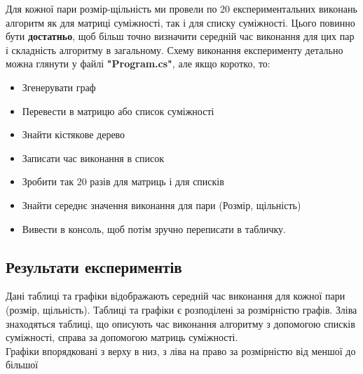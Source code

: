 \documentclass[titlepage, a4paper]{article}
\begin{document}
Для кожної пари розмір-щільність ми провели по 20 експериментальних виконань алгоритм як для матриці суміжності, так і для списку суміжності. Цього повинно бути \textbf{достатньо}, щоб більш точно визначити середній час виконання для цих пар і складність алгоритму в загальному. Схему виконання експерименту детально можна глянути у файлі \textbf{"Program.cs"}, але якщо коротко, то:
\begin{itemize}
	\item Згенерувати граф
	\item Перевести в матрицю або список суміжності
	\item Знайти кістякове дерево
	\item Записати час виконання в список
	\item Зробити так 20 разів для матриць і для списків
	\item Знайти середнє значення виконання для пари (Розмір, щільність)
	\item Вивести в консоль, щоб потім зручно переписати в табличку.
\end{itemize}

\subsection{Результати експериментів}

Дані таблиці та графіки відображають середній час виконання для кожної пари (розмір, щільність).
Таблиці та графіки є розподілені за розмірністю графів. Зліва знаходяться таблиці, що описують час виконання алгоритму з допомогою списків суміжності, справа за допомогою матриць суміжності. \\
Графіки впорядковані з верху в низ, з ліва на право за розмірністю від меншої до більшої \\
\end{document}
